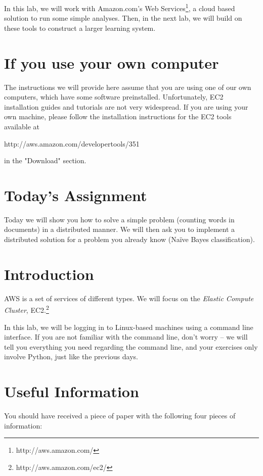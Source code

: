 In this lab, we will work with Amazon.com's Web Services\footnote{http://aws.amazon.com/}, a cloud based solution
to run some simple analyses. Then, in the next lab, we will build on these
tools to construct a larger learning system.

\section*{If you use your own computer}

The instructions we will provide here assume that you are using one of our own computers, which have some software preinstalled. Unfortunately, EC2 installation guides and tutorials are not very widespread. If you are using your own machine, please follow the installation instructions for the EC2 tools available at

http://aws.amazon.com/developertools/351

in the "Download" section.

\section*{Today's Assignment}

Today we will show you how to solve a simple problem (counting words in documents) in a distributed manner. We will then ask you to implement a distributed solution for a problem you already know (Na\"{i}ve Bayes classification).

\section{Introduction}

AWS is a set of services of different types. We will focus on the \emph{Elastic
Compute Cluster}, EC2.\footnote{http://aws.amazon.com/ec2/}

In this lab, we will be logging in to Linux-based machines using a command line
interface. If you are not familiar with the command line, don't worry -- we will tell you everything you need regarding the command line, and your exercises only involve Python, just like the previous days.

\section{Useful Information}

You should have received a piece of paper with the following four pieces of
information:

